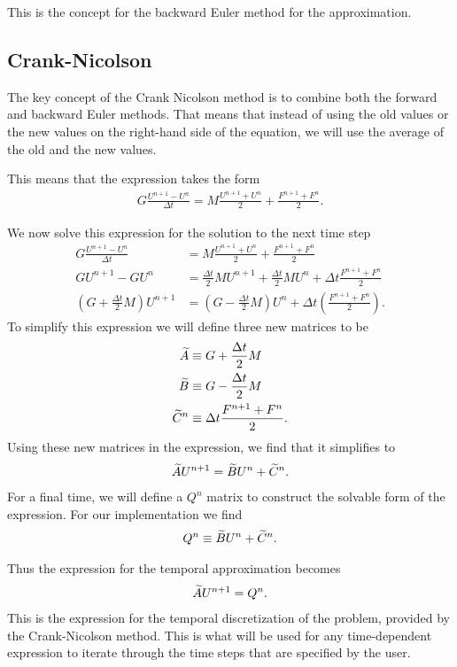 \documentclass[../fem.tex]{subfile}
\begin{document}
This is the concept for the backward Euler method for the approximation.

\subsection{Crank-Nicolson}%
\label{sub:crank_nicolson}

The key concept of the Crank Nicolson method is to combine both the forward
and backward Euler methods. That means that instead of using the old values or
the new values on the right-hand side of the equation, we will use the average
of the old and the new values.

This means that the expression takes the form
\begin{align*}
  G\frac{U^{n+1}-U^n}{\Delta t}=M\frac{U^{n+1}+U^n}{2}+\frac{F^{n+1}+F^n}{2}.
\end{align*}

We now solve this expression for the solution to the next time step
\begin{align*}
  G\frac{U^{n+1}-U^n}{\Delta t}&=M\frac{U^{n+1}+U^n}{2}+\frac{F^{n+1}+F^n}{2}\\
  GU^{n+1}-GU^n&=\frac{\Delta t}{2}MU^{n+1}+\frac{\Delta t}{2}MU^n+\Delta
  t\frac{F^{n+1}+F^n}{2}\\
  \left(G+\frac{\Delta t}{2}M\right)U^{n+1}&=\left(G-\frac{\Delta
    t}{2}M\right)U^n+\Delta t\left(\frac{F^{n+1}+F^n}{2}\right).
\end{align*}
To simplify this expression we will define three new matrices to be
\begin{align*}
  \widetilde{A}&\equiv G+\frac{\Delta t}{2}M\\
  \widetilde{B}&\equiv G-\frac{\Delta t}{2}M\\
  \widetilde{C}^n&\equiv \Delta t\frac{F^{n+1}+F^n}{2}.
\end{align*}
Using these new matrices in the expression, we find that it simplifies to
\begin{align*}
  \widetilde{A}U^{n+1}=\widetilde{B}U^n+\widetilde{C}^n.
\end{align*}
For a final time, we will define a $Q^n$ matrix to construct the solvable form
of the expression. For our implementation we find
\begin{align*}
  Q^n\equiv\widetilde{B}U^n+\widetilde{C}^n.
\end{align*}

Thus the expression for the temporal approximation becomes
\begin{align*}
  \widetilde{A}U^{n+1}=Q^n.
\end{align*}
This is the expression for the temporal discretization of the problem, provided
by the Crank-Nicolson method. This is what will be used for any time-dependent
expression to iterate through the time steps that are specified by the user.
\end{document}

